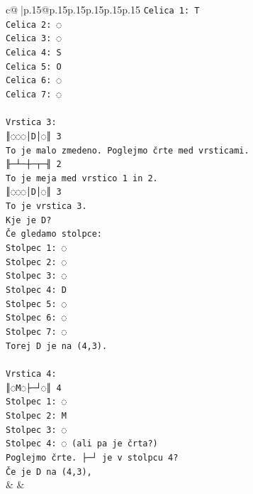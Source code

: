 \documentclass{article}
\begin{document}
{\begin{supertabular}{c@{$\;$}|p{.15\linewidth}@{}p{.15\linewidth}p{.15\linewidth}p{.15\linewidth}p{.15\linewidth}p{.15\linewidth}}
{{{\texttt{Celica 1: T} \\
\texttt{Celica 2: ◌} \\
\texttt{Celica 3: ◌} \\
\texttt{Celica 4: S} \\
\texttt{Celica 5: O} \\
\texttt{Celica 6: ◌} \\
\texttt{Celica 7: ◌} \\
\\ 
\texttt{Vrstica 3:} \\
\texttt{║◌◌◌│D│◌║ 3} \\
\texttt{To je malo zmedeno. Poglejmo črte med vrsticami.} \\
\texttt{╟─┴─┼─┬─╢ 2} \\
\texttt{To je meja med vrstico 1 in 2.} \\
\texttt{║◌◌◌│D│◌║ 3} \\
\texttt{To je vrstica 3.} \\
\texttt{Kje je D?} \\
\texttt{Če gledamo stolpce:} \\
\texttt{Stolpec 1: ◌} \\
\texttt{Stolpec 2: ◌} \\
\texttt{Stolpec 3: ◌} \\
\texttt{Stolpec 4: D} \\
\texttt{Stolpec 5: ◌} \\
\texttt{Stolpec 6: ◌} \\
\texttt{Stolpec 7: ◌} \\
\texttt{Torej D je na (4,3).} \\
\\ 
\texttt{Vrstica 4:} \\
\texttt{║◌M◌├─┘◌║ 4} \\
\texttt{Stolpec 1: ◌} \\
\texttt{Stolpec 2: M} \\
\texttt{Stolpec 3: ◌} \\
\texttt{Stolpec 4: ◌ (ali pa je črta?)} \\
\texttt{Poglejmo črte. ├─┘ je v stolpcu 4?} \\
\texttt{Če je D na (4,3),} \\
            }
        }
    }
    & & \\ \\


\end{supertabular}}
\end{document}

